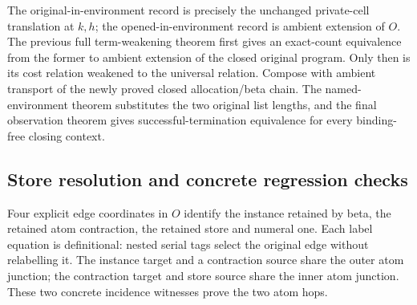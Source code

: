 


The original-in-environment record is precisely the unchanged private-cell
translation at $k,h$; the opened-in-environment record is ambient extension
of $O$. The previous full term-weakening theorem first gives an exact-count
equivalence from the former to ambient extension of the closed original
program. Only then is its cost relation weakened to the universal relation.
Compose with ambient transport of the newly proved closed allocation/beta
chain. The named-environment theorem substitutes the two original list
lengths, and the final observation theorem gives successful-termination
equivalence for every binding-free closing context.







\subsection{Store resolution and concrete regression checks}

Four explicit edge coordinates in $O$ identify the instance retained by
beta, the retained atom contraction, the retained store and numeral one.
Each label equation is definitional: nested serial tags select the original
edge without relabelling it. The instance target and a contraction source
share the outer atom junction; the contraction target and store source
share the inner atom junction. These two concrete incidence witnesses prove
the two atom hops.

